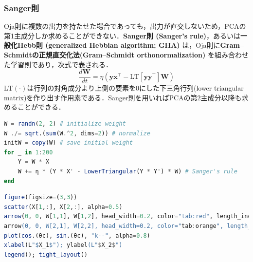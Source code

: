 \subsubsection{Sanger則}
Oja則に複数の出力を持たせた場合であっても，出力が直交しないため，PCAの第1主成分しか求めることができない．\textbf{Sanger則 (Sanger's rule)}，あるいは\textbf{一般化Hebb則 (generalized Hebbian algorithm; GHA)} は，Oja則に\textbf{Gram–Schmidtの正規直交化法(Gram–Schmidt orthonormalization)} を組み合わせた学習則であり，次式で表される．
\begin{equation}
\frac{d\mathbf{W}}{dt} = \eta \left(\mathbf{y}\mathbf{x}^\top - \mathrm{LT}\left[\mathbf{y}\mathbf{y}^\top\right] \mathbf{W}\right)
\end{equation}
$\mathrm{LT}(\cdot)$は行列の対角成分より上側の要素を0にした下三角行列(lower triangular matrix)を作り出す作用素である．Sanger則を用いればPCAの第2主成分以降も求めることができる．
\begin{lstlisting}[language=julia]
W = randn(2, 2) # initialize weight
W ./= sqrt.(sum(W.^2, dims=2)) # normalize
initW = copy(W) # save initial weight
for _ in 1:200
    Y = W * X
    W += η * (Y * X' - LowerTriangular(Y * Y') * W) # Sanger's rule
end
\end{lstlisting}
\begin{lstlisting}[language=julia]
figure(figsize=(3,3))
scatter(X[1,:], X[2,:], alpha=0.5)
arrow(0, 0, W[1,1], W[1,2], head_width=0.2, color="tab:red", length_includes_head=true, label=L"$w_1$")
arrow(0, 0, W[2,1], W[2,2], head_width=0.2, color="tab:orange", length_includes_head=true, label=L"$w_2$")
plot(cos.(θc), sin.(θc), "k--", alpha=0.8)
xlabel(L"$X_1$"); ylabel(L"$X_2$")
legend(); tight_layout()
\end{lstlisting}
